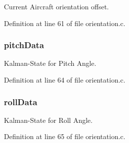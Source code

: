 Current Aircraft orientation offset. 



Definition at line 61 of file orientation.\-c.

\hypertarget{group__orientation_gaee2ebdd37342c4cfa69ce7ee1440fd1d}{
\subsubsection[{pitch\-Data}]{ pitch\-Data}}\label{group__orientation_gaee2ebdd37342c4cfa69ce7ee1440fd1d}


Kalman-\/\-State for Pitch Angle. 



Definition at line 64 of file orientation.\-c.

\hypertarget{group__orientation_ga327c51463b7ca66c1ed8d0f400ffbfec}{
\subsubsection[{roll\-Data}]{ roll\-Data}}\label{group__orientation_ga327c51463b7ca66c1ed8d0f400ffbfec}


Kalman-\/\-State for Roll Angle. 



Definition at line 65 of file orientation.\-c.

